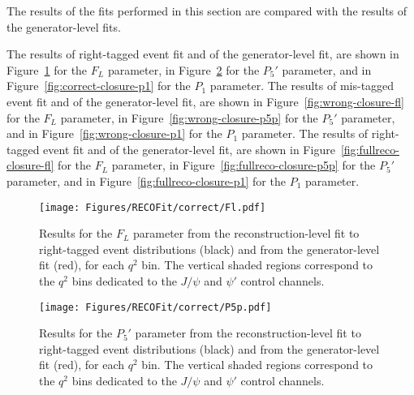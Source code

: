 
The results of the fits performed in this section are compared with the results of the generator-level fits.

The results of right-tagged event fit and of the generator-level fit, are shown in Figure~\ref{fig:correct-closure-fl} for the $F_L$ parameter, in Figure~\ref{fig:correct-closure-p5p} for the $P_5'$ parameter, and in Figure~\ref{fig:correct-closure-p1} for the $P_1$ parameter.
The results of mis-tagged event fit and of the generator-level fit, are shown in Figure~\ref{fig:wrong-closure-fl} for the $F_L$ parameter, in Figure~\ref{fig:wrong-closure-p5p} for the $P_5'$ parameter, and in Figure~\ref{fig:wrong-closure-p1} for the $P_1$ parameter.
The results of right-tagged event fit and of the generator-level fit, are shown in Figure~\ref{fig:fullreco-closure-fl} for the $F_L$ parameter, in Figure~\ref{fig:fullreco-closure-p5p} for the $P_5'$ parameter, and in Figure~\ref{fig:fullreco-closure-p1} for the $P_1$ parameter.

\begin{figure}[!hbt]
  \centering
  \texttt{[image: Figures/RECOFit/correct/Fl.pdf]}
  \caption{Results for the $F_L$ parameter from the reconstruction-level fit to right-tagged event distributions (black) and from the generator-level fit (red), for each $q^2$ bin.
    The vertical shaded regions correspond to the $q^2$ bins dedicated to the $J/\psi$ and $\psi'$ control channels.}
  \label{fig:correct-closure-fl}
\end{figure}


\begin{figure}[!hbt]
  \centering
  \texttt{[image: Figures/RECOFit/correct/P5p.pdf]}
  \caption{Results for the $P_5'$ parameter from the reconstruction-level fit to right-tagged event distributions (black) and from the generator-level fit (red), for each $q^2$ bin.
    The vertical shaded regions correspond to the $q^2$ bins dedicated to the $J/\psi$ and $\psi'$ control channels.}
  \label{fig:correct-closure-p5p}
\end{figure}

